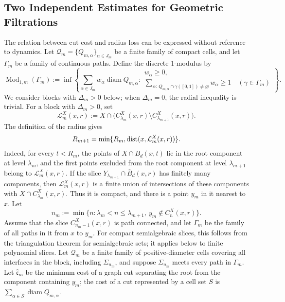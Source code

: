\subsection{Two Independent Estimates for Geometric Filtrations}

The relation between cut cost and radius loss can be expressed without
reference to dynamics. Let
\(\mathcal Q_m=\{Q_{m,\alpha}\}_{\alpha\in J_m}\) be a finite family of
compact cells, and let \(\Gamma_m\) be a family of continuous paths.
Define the discrete \(1\)-modulus by
\[
 \operatorname{Mod}_{1,m}(\Gamma_m):=
 \inf\left\{
 \sum_{\alpha\in J_m}w_\alpha\operatorname{diam}Q_{m,\alpha}:
 \begin{array}{l}
 w_\alpha\ge0,\\[-1mm]
 \displaystyle
 \sum_{\alpha:\,Q_{m,\alpha}\cap\gamma([0,1])\ne\varnothing}
 w_\alpha\ge1\quad(\gamma\in\Gamma_m)
 \end{array}\right\}.
\]
We consider blocks with \(\Delta_m>0\) below; when \(\Delta_m=0\), the
radial inequality is trivial. For a block with \(\Delta_m>0\), set
\[
 \mathcal L_m^X(x,r):=
 X\cap\bigl(C_{\lambda_m}^X(x,r)
                \setminus C_{\lambda_{m+1}}^X(x,r)\bigr).
\]
The definition of the radius gives
\[
 R_{m+1}=\min\{R_m,\operatorname{dist}(x,\mathcal L_m^X(x,r))\}.
\]
Indeed, for every \(t<R_m\), the points of
\(X\cap\overline B_d(x,t)\) lie in the root component at level
\(\lambda_m\), and the first points excluded from the root component at
level \(\lambda_{m+1}\) belong to \(\mathcal L_m^X(x,r)\). If the slice
\(Y_{\lambda_{m+1}}\cap\overline B_d(x,r)\) has finitely many
components, then \(\mathcal L_m^X(x,r)\) is a finite union of
intersections of these components with
\(X\cap C_{\lambda_m}^X(x,r)\). Thus it is compact, and there is a
point \(y_m\) in it nearest to \(x\). Let
\[
 n_m:=\min\{n:\lambda_m<n\le\lambda_{m+1},\
                    y_m\notin C_n^X(x,r)\}.
\]
Assume that the slice \(C_{n_m-1}^X(x,r)\) is path connected, and let
\(\Gamma_m\) be the family of all paths in it from \(x\) to \(y_m\).
For compact semialgebraic slices, this follows from the triangulation
theorem for semialgebraic sets; it applies below to finite polynomial
slices. Let \(\mathcal Q_m\) be a finite family of positive-diameter
cells covering all interfaces in the block, including
\(\Sigma_{n_m}\), and suppose \(\Sigma_{n_m}\) meets every path in
\(\Gamma_m\). Let \(\widehat{\mathfrak c}_m\) be the minimum cost of a
graph cut separating the root from the component containing \(y_m\);
the cost of a cut represented by a cell set \(S\) is
\(\sum_{\alpha\in S}\operatorname{diam}Q_{m,\alpha}\).

